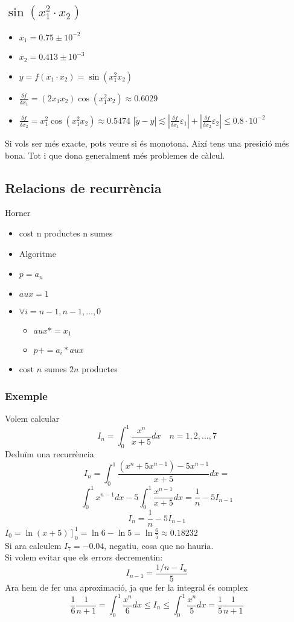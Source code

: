 \documentclass{article}
\begin{document}
\subsection{$\sin(x^2_1 \cdot x_2)$}
\begin{itemize}
	\item $x_1 = 0.75 \pm 10^{-2}$
	\item $x_2 = 0.413\pm 10^{-3}$
	\item $y = f(x_1 \cdot x_2) = \sin (x_1^2 x_2)$
	\item $\frac{\delta f}{\delta x_1} = (2 x_1 x_2)\cos(x_1^2x_2) \approx 0.6029$
	\item $\frac{\delta f}{\delta x_2} = x_1^2 \cos(x_1^2x_2) \approx 0.5474$
		\subitem $|\tilde y - y| \lesssim |\frac{\delta f}{\delta x_1} \varepsilon_1| + |\frac{\delta f}{\delta x_2} \varepsilon_2|
			\le 0.8 \cdot 10^{-2}$
\end{itemize}
Si vols ser més exacte, pots veure si és monotona. Així tens una presició més bona. Tot i que dona generalment més problemes de càlcul.

\subsection{Relacions de recurrència}
Horner
\begin{itemize}
\item cost
	\subitem n productes
	\subitem n sumes
\item Algoritme
\item $p = a_n$
\item $aux = 1$
\item $\forall i = n-1, n-1, \dots , 0$
	\begin{itemize}
	\item $aux *= x_1$
	\item $p += a_i * aux$
	\end{itemize}
\item cost
	\subitem $n$ sumes
	\subitem $2n$ productes

\end{itemize}

\subsubsection{Exemple}
Volem calcular
$$I_n = \int_0^1 \frac{x^n}{x+5} dx\quad n = 1, 2, \dots, 7$$
Deduïm una recurrència
$$I_n = \int_0^1 \frac{(x^n + 5x^{n-1}) - 5x^{n-1}}{x + 5}dx =$$
$$\int_0^1 x^{n-1}dx -5\int_0^1 \frac{x^{n-1}}{x+5}dx = \frac{1}{n} - 5I_{n-1}$$
$$I_n = \frac{1}{n} -5I_{n-1}$$
$I_0 = \left. \ln (x+5)\right]_0^1 = \ln 6 -\ln 5 = \ln\frac{6}{5} \approx 0.18232$\\
Si ara calculem $I_7 = -0.04$, negatiu, cosa que no hauria.\\
Si volem evitar que els errors decrementin:
$$I_{n-1} = \frac{1/n - I_n}{5}$$
Ara hem de fer una aproximació, ja que fer la integral és complex
$$\frac{1}{6} \frac{1}{n+1} = \int_0^1 \frac{x^n}{6} dx \le I_n \le \int_0^1 \frac{x^n}{5}dx = \frac{1}{5} \frac{1}{n+1}$$
\end{document}
